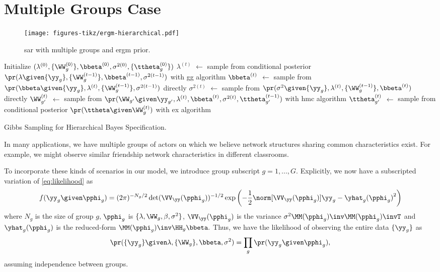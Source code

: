 \section{Multiple Groups Case}\label{app:multi-group}

\begin{figure}[t]
	\centering
	\texttt{[image: figures-tikz/ergm-hierarchical.pdf]}
	\caption{\acrshort{sar} with multiple groups and \acrshort{ergm} prior.}
	\label{fig:sar-ergm-multi-group}
\end{figure}

\begin{algorithm}[t]
	\centering
	\begin{algorithmic}[1]
		\STATE Initialize $(\lambda^{(0)}, \{\WW^{(0)}_{g}\}, \bbeta^{(0)}, \sigma^{2(0)}, \{\ttheta_{g}^{(0)}\})$
		\STATE $\lambda^{(t)}$ $\gets$ sample from conditional posterior $\pr(\lambda\given\{\yy_{g}\},\{\WW_{g}^{(t-1)}\},\bbeta^{(t-1)},\sigma^{2(t-1)})$ with \acrshort{gg} algorithm
		\STATE $\bbeta^{(t)}$  $\gets$ sample from $\pr(\bbeta\given\{\yy_{g}\},\lambda^{(t)},\{\WW_{g}^{(t-1)}\},\sigma^{2(t-1)})$ directly
		\STATE $\sigma^{2(t)}$ $\gets$ sample from $\pr(\sigma^{2}\given\{\yy_{g}\},\lambda^{(t)},\{\WW_{g}^{(t-1)}\},\bbeta^{(t)})$ directly
		\STATE $\WW_{g'}^{(t)}$ $\gets$ sample from
		$\pr(\WW_{g'}\given\yy_{g'},\lambda^{(t)},\bbeta^{(t)},\sigma^{2(t)},\ttheta_{g'}^{(t-1)})$
		with \acrshort{hmc} algorithm
		\STATE $\ttheta_{g'}^{(t)}$ $\gets$ sample from conditional posterior $\pr(\ttheta\given\WW_{g}^{(t)})$ with \acrshort{ex} algorithm
		\ENDFOR
		\ENDFOR
	\end{algorithmic}
	\caption{Gibbs Sampling for Hierarchical Bayes Specification.}
	\label{alg:gibbs}
\end{algorithm}

In many applications,
we have multiple groups of actors on which we believe network structures sharing common characteristics exist.
For example, we might observe similar friendship network characteristics in different classrooms.

To incorporate these kinds of scenarios in our model,
we introduce group subscript $g=1,...,G$.
Explicitly, we now have a subscripted variation of \eqref{eq:likelihood} as
\begin{align*}
	f(\yy_{g}\given\pphi_{g})
	=
	(2\pi)^{-N_{g}/2}
	\det(\VV_{\yy}(\pphi_{g}))^{-1/2}
	\exp\left( -\frac12 \norm[ \VV_{\yy}(\pphi_{g}) ]{ \yy_{g}-\yhat_{g}(\pphi_{g}) }^2 \right)
\end{align*}
where $N_{g}$ is the size of group $g$,
$\pphi_{g}$ is $\{\lambda,\WW_{g},\beta,\sigma^2\}$,
$\VV_{\yy}(\pphi_{g})$ is the variance
$\sigma^2\MM(\pphi_{g})\inv\MM(\pphi_{g})\invT$
and $\yhat_{g}(\pphi_{g})$ is the reduced-form
$\MM(\pphi_{g})\inv\HH_{g}\bbeta.$
Thus, we have the likelihood of observing the entire data $\{\yy_{g}\}$ as
\begin{align*}
	\pr(\{\yy_{g}\}\given\lambda,\{\WW_{g}\},\bbeta,\sigma^{2})
	=
	\prod_{g} \pr(\yy_{g}\given\pphi_{g}),
\end{align*}
assuming independence between groups.

